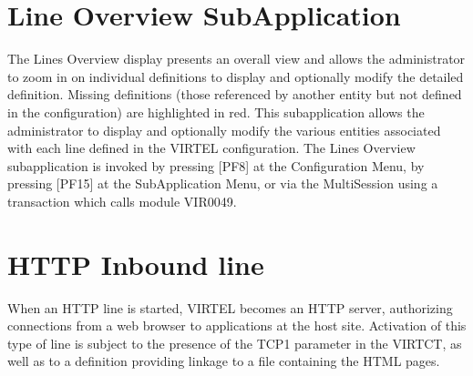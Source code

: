 \documentclass[letterpaper,10pt,english]{sphinxmanual}
\begin{document}
\section{Line Overview Sub\sphinxhyphen{}Application}
\label{\detokenize{connectivity_guide:line-overview-sub-application}}\label{\detokenize{connectivity_guide:index-9}}
\sphinxAtStartPar
The Lines Overview display presents an overall view and allows the administrator to zoom in on individual definitions to display and optionally modify the detailed definition. Missing definitions (those referenced by another entity but not defined in the configuration) are highlighted in red. This sub\sphinxhyphen{}application allows the administrator to display and optionally modify the various entities associated with each line defined in the VIRTEL configuration. The Lines Overview sub\sphinxhyphen{}application is invoked by pressing {[}PF8{]} at the Configuration Menu, by pressing {[}PF15{]} at the Sub\sphinxhyphen{}Application Menu, or via the Multi\sphinxhyphen{}Session using a transaction which calls module VIR0049.

\sphinxAtStartPar
{}

\newpage

\ignorespaces 

\section{HTTP Inbound line}
\label{\detokenize{connectivity_guide:http-inbound-line}}\label{\detokenize{connectivity_guide:index-10}}
\sphinxAtStartPar
When an HTTP line is started, VIRTEL becomes an HTTP server, authorizing connections from a web browser to applications at the host site. Activation of this type of line is subject to the presence of the TCP1 parameter in the VIRTCT, as well as to a definition providing linkage to a file containing the HTML pages.

\sphinxAtStartPar
{}
\end{document}
